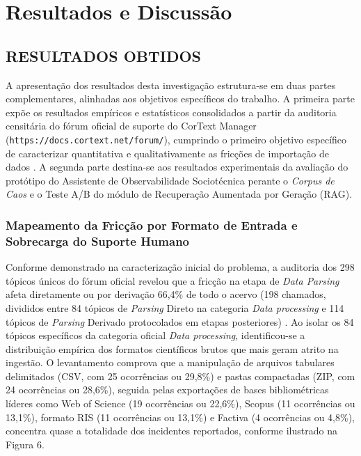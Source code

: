 \documentclass[
	oneside,
	a4paper,
	12pt,
	chapter=TITLE,
	section=TITLE,
	english,
	brazilian
]{abntex2}
\begin{document}
\chapter{Resultados e Discussão}\label{sec:resultados_e_discussao}


\FloatBarrier
\section{RESULTADOS OBTIDOS}\label{sec:resultados_obtidos}


A apresentação dos resultados desta investigação estrutura-se em duas partes complementares, alinhadas aos objetivos específicos do trabalho. A primeira parte expõe os resultados empíricos e estatísticos consolidados a partir da auditoria censitária do fórum oficial de suporte do CorText Manager (\texttt{https://docs.\allowbreak cortext.\allowbreak net/\allowbreak forum/}), cumprindo o primeiro objetivo específico de caracterizar quantitativa e qualitativamente as fricções de importação de dados \cite{CorText2026}. A segunda parte destina-se aos resultados experimentais da avaliação do protótipo do Assistente de Observabilidade Sociotécnica perante o \textit{Corpus de Caos} e o Teste A/B do módulo de Recuperação Aumentada por Geração (RAG).

\FloatBarrier
\subsection{Mapeamento da Fricção por Formato de Entrada e Sobrecarga do Suporte Humano}\label{sec:mapeamento_da_friccao_por_formato_de_ent}


Conforme demonstrado na caracterização inicial do problema, a auditoria dos 298 tópicos únicos do fórum oficial revelou que a fricção na etapa de \textit{Data Parsing} afeta diretamente ou por derivação 66,4\% de todo o acervo (198 chamados, divididos entre 84 tópicos de \textit{Parsing} Direto na categoria \textit{Data processing} e 114 tópicos de \textit{Parsing} Derivado protocolados em etapas posteriores) \cite{CorText2026}. Ao isolar os 84 tópicos específicos da categoria oficial \textit{Data processing}, identificou-se a distribuição empírica dos formatos científicos brutos que mais geram atrito na ingestão. O levantamento comprova que a manipulação de arquivos tabulares delimitados (CSV, com 25 ocorrências ou 29,8\%) e pastas compactadas (ZIP, com 24 ocorrências ou 28,6\%), seguida pelas exportações de bases bibliométricas líderes como Web of Science (19 ocorrências ou 22,6\%), Scopus (11 ocorrências ou 13,1\%), formato RIS (11 ocorrências ou 13,1\%) e Factiva (4 ocorrências ou 4,8\%), concentra quase a totalidade dos incidentes reportados, conforme ilustrado na Figura 6.
\end{document}
